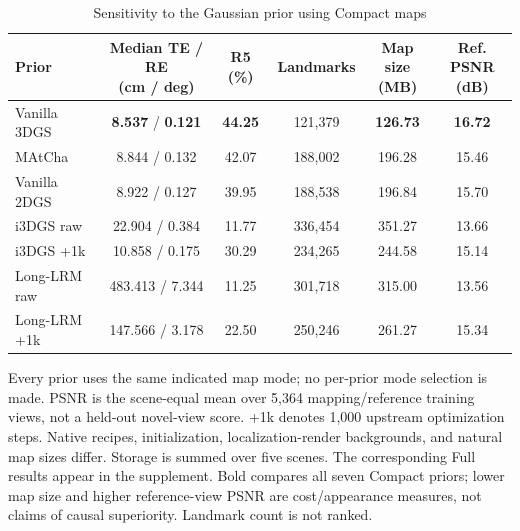 \begin{table}[tp]
\centering
\footnotesize
\setlength{\tabcolsep}{4pt}
\renewcommand{\arraystretch}{1.12}
\caption{Sensitivity to the Gaussian prior using Compact maps}
\label{tab:t8}
\begin{tabular}{lccccc}
\toprule
Prior & \shortstack{Median TE / RE\\(cm / deg)} & R5 (\%) & Landmarks & \shortstack{Map size\\(MB)} & \shortstack{Ref. PSNR\\(dB)} \\
\midrule
Vanilla 3DGS & \textbf{8.537} / \textbf{0.121} & \textbf{44.25} & 121,379 & \textbf{126.73} & \textbf{16.72} \\
MAtCha & 8.844 / 0.132 & 42.07 & 188,002 & 196.28 & 15.46 \\
Vanilla 2DGS & 8.922 / 0.127 & 39.95 & 188,538 & 196.84 & 15.70 \\
i3DGS raw & 22.904 / 0.384 & 11.77 & 336,454 & 351.27 & 13.66 \\
i3DGS +1k & 10.858 / 0.175 & 30.29 & 234,265 & 244.58 & 15.14 \\
Long-LRM raw & 483.413 / 7.344 & 11.25 & 301,718 & 315.00 & 13.56 \\
Long-LRM +1k & 147.566 / 3.178 & 22.50 & 250,246 & 261.27 & 15.34 \\
\bottomrule
\end{tabular}
\par\smallskip\begin{minipage}{0.98\linewidth}\footnotesize Every prior uses the same indicated map mode; no per-prior mode selection is made. PSNR is the scene-equal mean over 5,364 mapping/reference training views, not a held-out novel-view score. +1k denotes 1,000 upstream optimization steps. Native recipes, initialization, localization-render backgrounds, and natural map sizes differ. Storage is summed over five scenes. The corresponding Full results appear in the supplement. Bold compares all seven Compact priors; lower map size and higher reference-view PSNR are cost/appearance measures, not claims of causal superiority. Landmark count is not ranked.\end{minipage}
\end{table}

